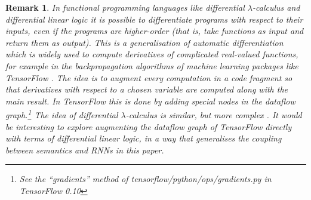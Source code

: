 \documentclass[english,letter paper,12pt,leqno]{article}
\theoremstyle{example}
\newtheorem{remark}[theorem]{Remark}
\numberwithin{equation}{section}
\begin{document}
\begin{remark} In functional programming languages like differential $\lambda$-calculus \cite{difflambda} and differential linear logic \cite{ehrhard-survey} it is possible to differentiate programs with respect to their inputs, even if the programs are higher-order (that is, take functions as input and return them as output). This is a generalisation of automatic differentiation \cite{griewank} which is widely used to compute derivatives of complicated real-valued functions, for example in the backpropagation algorithms of machine learning packages like TensorFlow \cite[\S 4.1]{tensorflow}. The idea is to augment every computation in a code fragment so that derivatives with respect to a chosen variable are computed along with the main result. In TensorFlow this is done by adding special nodes in the dataflow graph.\footnote{See the ``gradients'' method of tensorflow/python/ops/gradients.py in TensorFlow 0.10} The idea of differential $\lambda$-calculus is similar, but more complex \cite{manzyuk}. It would be interesting to explore augmenting the dataflow graph of TensorFlow directly with terms of differential linear logic, in a way that generalises the coupling between semantics and RNNs in this paper.
\end{remark}

\end{document}
